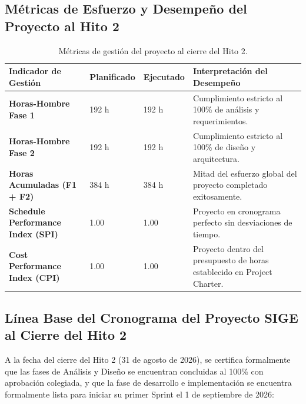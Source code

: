 \documentclass[12pt,a4paper]{article}
\begin{document}
\subsection{Métricas de Esfuerzo y Desempeño del Proyecto al Hito 2}
\begin{table}[H]
\centering
\small
\renewcommand{\arraystretch}{1.2}
\begin{tabularx}{\textwidth}{|>{\hsize=1.1\hsize\raggedright\arraybackslash\bfseries\footnotesize}X|>{\hsize=0.45\hsize\centering\arraybackslash\footnotesize}X|>{\hsize=0.45\hsize\centering\arraybackslash\footnotesize}X|>{\hsize=2.0\hsize\raggedright\arraybackslash\footnotesize}X|}
\hline
\rowcolor{tableheader}
\textbf{Indicador de Gestión} & \textbf{Planificado} & \textbf{Ejecutado} & \textbf{Interpretación del Desempeño} \\
\hline
Horas-Hombre Fase 1 & 192 h & 192 h & Cumplimiento estricto al 100\% de análisis y requerimientos. \\
\hline
Horas-Hombre Fase 2 & 192 h & 192 h & Cumplimiento estricto al 100\% de diseño y arquitectura. \\
\hline
Horas Acumuladas (F1 + F2) & 384 h & 384 h & Mitad del esfuerzo global del proyecto completado exitosamente. \\
\hline
Schedule Performance Index (SPI) & 1.00 & 1.00 & Proyecto en cronograma perfecto sin desviaciones de tiempo. \\
\hline
Cost Performance Index (CPI) & 1.00 & 1.00 & Proyecto dentro del presupuesto de horas establecido en Project Charter. \\
\hline
\end{tabularx}
\caption{Métricas de gestión del proyecto al cierre del Hito 2.}
\end{table}

\subsection{Línea Base del Cronograma del Proyecto SIGE al Cierre del Hito 2}
A la fecha del cierre del Hito 2 (31 de agosto de 2026), se certifica formalmente que las fases de Análisis y Diseño se encuentran concluidas al 100\% con aprobación colegiada, y que la fase de desarrollo e implementación se encuentra formalmente lista para iniciar su primer Sprint el 1 de septiembre de 2026:
\end{document}
